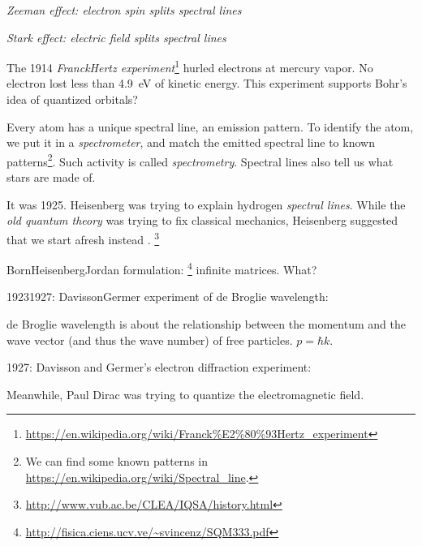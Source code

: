 \emph{Zeeman effect: electron spin splits spectral lines}

\emph{Stark effect: electric field splits spectral lines}

The 1914 \emph{Franck\textendash{}Hertz experiment}\footnote{\url{https://en.wikipedia.org/wiki/Franck\%E2\%80\%93Hertz_experiment}}
hurled electrons at mercury vapor.
No electron lost less than \SI{4.9}{eV} of kinetic energy.
This experiment supports Bohr's idea of quantized orbitals?
\cite{franck1967zusammenstosse}

Every atom has a unique spectral line, an emission pattern.
To identify the atom, we put it in a \emph{spectrometer},
and match the emitted spectral line
to known patterns\footnote{We can find some known patterns in \url{https://en.wikipedia.org/wiki/Spectral_line}.}.
Such activity is called \emph{spectrometry}.
Spectral lines also tell us what stars are made of.

It was 1925.
Heisenberg was trying to explain hydrogen \emph{spectral lines}.
While the \emph{old quantum theory} was trying to fix classical mechanics,
Heisenberg suggested that we start afresh instead \cite{heisenberg1925quantum}.
\footnote{\url{http://www.vub.ac.be/CLEA/IQSA/history.html}}


Born\textendash{}Heisenberg\textendash{}Jordan formulation:
\footnote{\url{http://fisica.ciens.ucv.ve/~svincenz/SQM333.pdf}}
infinite matrices.
What?

1923\textendash{}1927:
Davisson\textendash{}Germer experiment of de Broglie wavelength:

de Broglie wavelength is about the relationship between the momentum and the wave vector (and thus the wave number) of free particles.
\( p = \hbar k \).
\cite{okun2012abc}

1927: Davisson and Germer's electron diffraction experiment:

Meanwhile, Paul Dirac was trying to quantize the electromagnetic field.



